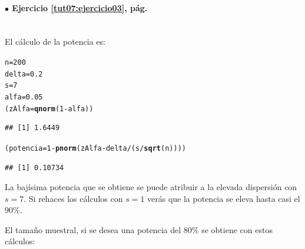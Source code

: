 \documentclass[10pt,a4paper]{article}\usepackage[]{graphicx}\usepackage[]{color}
\makeatletter
\newcommand{\hlnum}[1]{\textcolor[rgb]{0.686,0.059,0.569}{#1}}%
\newcommand{\hlopt}[1]{\textcolor[rgb]{0,0,0}{#1}}%
\newcommand{\hlstd}[1]{\textcolor[rgb]{0.345,0.345,0.345}{#1}}%
\newcommand{\hlkwb}[1]{\textcolor[rgb]{0.69,0.353,0.396}{#1}}%
\newcommand{\hlkwd}[1]{\textcolor[rgb]{0.737,0.353,0.396}{\textbf{#1}}}%
\newenvironment{kframe}{%
 \def\at@end@of@kframe{}%
 \ifinner\ifhmode%
  \def\at@end@of@kframe{\end{minipage}}%
  \begin{minipage}{\columnwidth}%
 \fi\fi%
 \def\FrameCommand##1{\hskip\@totalleftmargin \hskip-\fboxsep
 \colorbox{shadecolor}{##1}\hskip-\fboxsep
     \hskip-\linewidth \hskip-\@totalleftmargin \hskip\columnwidth}%
 \MakeFramed {\advance\hsize-\width
   \@totalleftmargin\z@ \linewidth\hsize
   \@setminipage}}%
 {\par\unskip\endMakeFramed%
 \at@end@of@kframe}
\newenvironment{knitrout}{}{} %
\makeatother
\begin{document}
\paragraph{\bf $\bullet$ Ejercicio \ref{tut07:ejercicio03}, pág. \pageref{tut07:ejercicio03}}
\label{tut07:ejercicio03:sol}\quad\\

El cálculo de la potencia es:
\begin{knitrout}
\color{fgcolor}\begin{kframe}
\begin{alltt}
\hlstd{n} \hlkwb{=} \hlnum{200}
\hlstd{delta} \hlkwb{=} \hlnum{0.2}
\hlstd{s} \hlkwb{=} \hlnum{7}
\hlstd{alfa} \hlkwb{=} \hlnum{0.05}
\hlstd{(zAlfa} \hlkwb{=} \hlkwd{qnorm}\hlstd{(}\hlnum{1}\hlopt{-} \hlstd{alfa))}
\end{alltt}
\begin{verbatim}
## [1] 1.6449
\end{verbatim}
\begin{alltt}
\hlstd{(potencia} \hlkwb{=} \hlnum{1} \hlopt{-} \hlkwd{pnorm}\hlstd{(zAlfa} \hlopt{-} \hlstd{delta} \hlopt{/} \hlstd{(s} \hlopt{/} \hlkwd{sqrt}\hlstd{(n)) ))}
\end{alltt}
\begin{verbatim}
## [1] 0.10734
\end{verbatim}
\end{kframe}
\end{knitrout}
La bajísima potencia que se obtiene se puede atribuir a la elevada dispersión con $s= 7$. Si rehaces los cálculos con $s=1$ verás que la potencia se eleva hasta casi el $90\%$.

El tamaño muestral, si se desea una potencia del 80\% se obtiene con estos cálculos:
\end{document}
